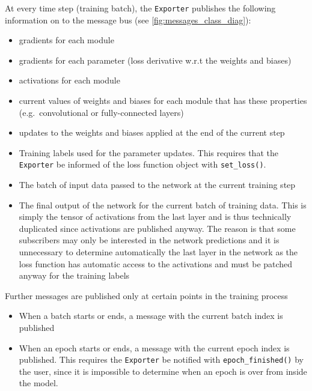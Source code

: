At every time step (training batch), the \texttt{Exporter} publishes the
following information on to the message bus (see \cref{fig:messages_class_diag}):

\begin{itemize}
    \item
        gradients for each module
    \item
        gradients for each parameter (loss derivative w.r.t the weights and biases)
    \item
        activations for each module
    \item
        current values of weights and biases for each module that has these properties
        (e.g.~convolutional or fully-connected layers)
    \item
        updates to the weights and biases applied at the end of the current
        step
    \item
        Training labels used for the parameter updates. This requires that the
        \texttt{Exporter} be informed of the loss function object with
        \lstinline{set_loss()}.
    \item
        The batch of input data passed to the network at the current training step
    \item
        The final output of the network for the current batch of training data.
        This is simply the tensor of activations from the last layer and is thus
        technically duplicated since activations are published anyway. The
        reason is that some subscribers may only be interested in the network
        predictions and it is unnecessary to determine automatically the last
        layer in the network as the loss function has automatic access to
        the activations and must be patched anyway for the training labels
\end{itemize}

Further messages are published only at certain points in the training process

\begin{itemize}
    \item
        When a batch starts or ends, a message with the current batch index is published
    \item
        When an epoch starts or ends, a message with the current epoch index is
        published. This requires the \texttt{Exporter} be notified with
        \lstinline{epoch_finished()} by the user, since it is impossible to
        determine when an epoch is over from inside the model.
\end{itemize}


